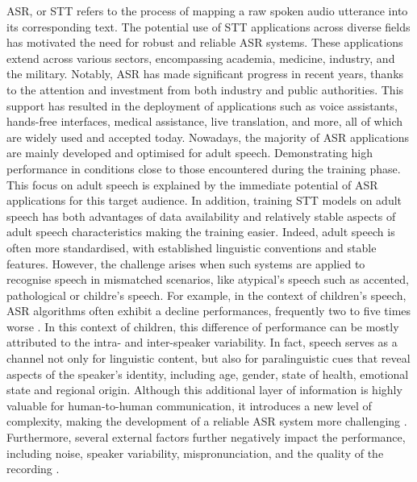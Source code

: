 \label{chap:Chapter2}
\cleardoublepage
\ac{ASR}, or \ac{STT} refers to the process of mapping a raw spoken audio utterance into its corresponding text. 
The potential use of \ac{STT} applications across diverse fields has motivated the need for robust and reliable \ac{ASR} systems. These applications extend across various sectors, encompassing academia, medicine, industry, and the military. Notably, \ac{ASR} has made significant progress in recent years, thanks to the attention and investment from both industry and public authorities. This support has resulted in the deployment of applications such as voice assistants, hands-free interfaces, medical assistance, live translation, and more, all of which are widely used and accepted today.
Nowadays, the majority of \ac{ASR} applications are mainly developed and optimised for adult speech. Demonstrating high performance in conditions close to those encountered during the training phase. This focus on adult speech is explained by the immediate potential of \ac{ASR} applications for this target audience. In addition, training \ac{STT} models on adult speech has both advantages of data availability and relatively stable aspects of adult speech characteristics making the training easier. Indeed, adult speech is often more standardised, with established linguistic conventions and stable features.
However, the challenge arises when such systems are applied to recognise speech in mismatched scenarios, like atypical's speech such as accented, pathological or childre's speech. For example, in the context of children's speech, \ac{ASR} algorithms often exhibit a decline performances, frequently two to five times worse \cite{childrenSpeechWorse}. In this context of children, this difference of performance can be mostly attributed to the intra- and inter-speaker variability. In fact, speech serves as a channel not only for linguistic content, but also for paralinguistic cues that reveal aspects of the speaker's identity, including age, gender, state of health, emotional state and regional origin. Although this additional layer of information is highly valuable for human-to-human communication, it introduces a new level of complexity, making the development of a reliable \ac{ASR} system more challenging \cite{li2023asr}.
Furthermore, several external factors further negatively impact the performance, including noise, speaker variability, mispronunciation, and the quality of the recording \cite{li2014overview,king2017robust}.



